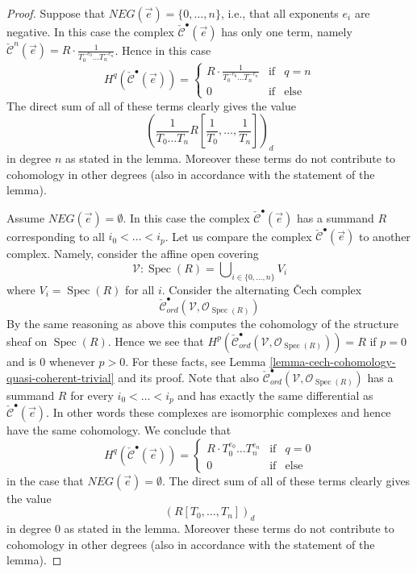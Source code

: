 \documentclass[10pt,a4paper]{amsart}
\theoremstyle{plain}
\theoremstyle{definition}
\theoremstyle{remark}
\numberwithin{equation}{subsection}
\def\Spec{\mathop{\mathrm{Spec}}}
\begin{document}
\begin{proof}
\medskip\noindent
Suppose that $NEG(\vec{e}) = \{0, \ldots, n\}$, i.e., that all
exponents $e_i$ are negative.
In this case the complex $\check{\mathcal{C}}^\bullet(\vec{e})$ has
only one term, namely $\check{\mathcal{C}}^n(\vec{e}) =
R \cdot \frac{1}{T_0^{-e_0} \ldots T_n^{-e_n}}$. Hence in this
case
$$
H^q(\check{\mathcal{C}}^\bullet(\vec{e})) =
\left\{
\begin{matrix}
R \cdot \frac{1}{T_0^{-e_0} \ldots T_n^{-e_n}} & \text{if} & q = n \\
0 & \text{if} & \text{else}
\end{matrix}
\right.
$$
The direct sum of all of these terms clearly gives the value
$$
\left(\frac{1}{T_0 \ldots T_n} R[\frac{1}{T_0}, \ldots, \frac{1}{T_n}]\right)_d
$$
in degree $n$ as stated in the lemma. Moreover these terms do not contribute
to cohomology in other degrees (also in accordance with the statement of the
lemma).

\medskip\noindent
Assume $NEG(\vec{e}) = \emptyset$. In this case the complex
$\check{\mathcal{C}}^\bullet(\vec{e})$ has a summand $R$ corresponding
to all $i_0 < \ldots < i_p$.
Let us compare the complex $\check{\mathcal{C}}^\bullet(\vec{e})$
to another complex. Namely, consider the affine open covering
$$
\mathcal{V} : \Spec(R) = \bigcup\nolimits_{i \in \{0, \ldots, n\}} V_i
$$
where $V_i = \Spec(R)$ for all $i$. Consider the alternating
{\v C}ech complex
$$
\check{\mathcal{C}}_{ord}^\bullet(\mathcal{V}, \mathcal{O}_{\Spec(R)})
$$
By the same reasoning as above this computes the cohomology of the
structure sheaf on $\Spec(R)$. Hence we see that
$H^p(
\check{\mathcal{C}}_{ord}^\bullet(\mathcal{V}, \mathcal{O}_{\Spec(R)})
) = R$ if $p = 0$ and is $0$ whenever $p > 0$.
For these facts, see
Lemma \ref{lemma-cech-cohomology-quasi-coherent-trivial} and its proof.
Note that also
$\check{\mathcal{C}}_{ord}^\bullet(\mathcal{V}, \mathcal{O}_{\Spec(R)})$
has a summand $R$ for every $i_0 < \ldots < i_p$ and has exactly the same
differential as $\check{\mathcal{C}}^\bullet(\vec{e})$. In other words
these complexes are isomorphic complexes and hence have the same cohomology.
We conclude that
$$
H^q(\check{\mathcal{C}}^\bullet(\vec{e})) =
\left\{
\begin{matrix}
R \cdot T_0^{e_0} \ldots T_n^{e_n} & \text{if} & q = 0 \\
0 & \text{if} & \text{else}
\end{matrix}
\right.
$$
in the case that $NEG(\vec{e}) = \emptyset$.
The direct sum of all of these terms clearly gives the value
$$
(R[T_0, \ldots, T_n])_d
$$
in degree $0$ as stated in the lemma. Moreover these terms do not contribute
to cohomology in other degrees (also in accordance with the statement of the
lemma).


\end{proof}
\end{document}
